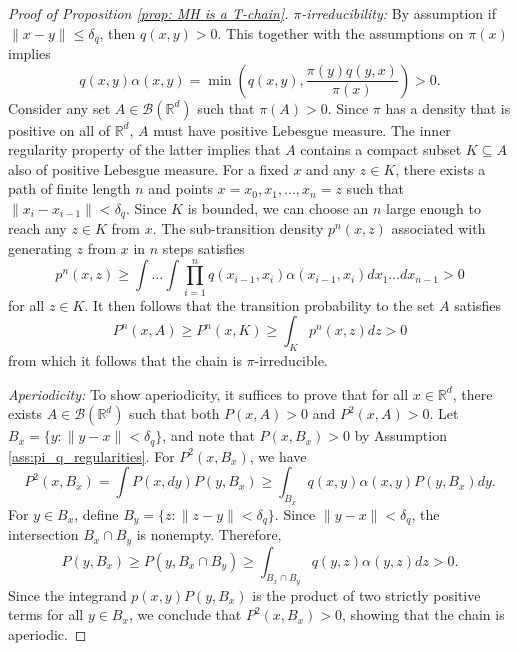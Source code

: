 \documentclass{article}
\theoremstyle{definition}
\theoremstyle{plain}
\begin{document}
\begin{proof}[Proof of Proposition \ref{prop: MH is a T-chain}]
\textit{$\pi$-irreducibility:} 
By assumption if $\|x-y\|\le \delta_q$, then $q(x,y)>0$. This together with the assumptions on $\pi(x)$ implies
\begin{equation} \label{eq:q_alpha_lb}
q(x,y)\alpha(x,y) = \min\left(q(x,y),\frac{\pi(y)q(y,x)}{\pi(x)}\right) > 0.
\end{equation}
Consider any set $A \in \mathcal{B}(\mathbb{R}^d)$ such that $\pi(A) > 0$. Since $\pi$ has a density that is positive on all of $\mathbb{R}^d$, $A$ must have positive Lebesgue measure. The inner regularity property of the latter implies that $A$ contains a compact subset $K \subseteq A$ also of positive Lebesgue measure. For a fixed $x$ and any $z \in K$, there exists a path of finite length $n$ and points $x = x_0, x_1, \dots, x_n = z$ such that $\|x_i - x_{i-1}\| < \delta_q$. Since $K$ is bounded, we can choose an $n$ large enough to reach any $z \in K$ from $x$. The sub-transition density $p^n(x,z)$ associated with generating $z$ from $x$ in $n$ steps satisfies
\[
p^n(x, z) \geq \int \dots \int \prod_{i=1}^n q(x_{i-1}, x_i)\alpha(x_{i-1},x_i) dx_1 \dots dx_{n-1} > 0
\]
for all $z \in K$. It then follows that the transition probability to the set $A$ satisfies
\[
P^n(x, A) \ge P^n(x,K) \geq \int_K p^n(x,z)dz > 0
\]
from which it follows that the chain is $\pi$-irreducible.

\textit{Aperiodicity:}
To show aperiodicity, it suffices to prove that for all $x\in \mathbb{R}^d$, there exists $A \in \mathcal{B}(\mathbb{R}^d)$ such that both $P(x,A)>0$ and $P^2(x,A)>0$.  Let $B_x =\{y:\|y-x\|<\delta_q\}$, and note that $P(x,B_x) >0$ by Assumption \ref{ass:pi_q_regularities}.  For $P^2(x,B_x)$, we have
\begin{equation}
    P^2(x,B_x) = \int P(x,dy)P(y,B_x) \ge \int_{B_x} q(x,y)\alpha(x,y)P(y,B_x)dy.
\end{equation}
For $y\in B_x$, define $B_y  = \{z:\|z-y\|<\delta_q\}$. Since $\|y-x\| < \delta_q$, the intersection $B_x\cap B_y$ is nonempty. Therefore,
$$
P(y,B_x)\ge P(y, B_x\cap B_y) \ge \int_{B_x\cap B_y} q(y,z)\alpha(y,z)dz>0.
$$
Since the integrand $p(x,y)P(y,B_x)$ is the product of two strictly positive terms for all $y \in B_x$, we conclude that $P^2(x,B_x) > 0$, showing that the chain is aperiodic.


\end{proof}
\end{document}
